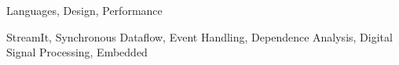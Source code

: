 

\begin{terms}
Languages, Design, Performance
\end{terms}

\begin{keywords}
StreamIt, Synchronous Dataflow, Event Handling, Dependence Analysis,
Digital Signal Processing, Embedded
\end{keywords}
